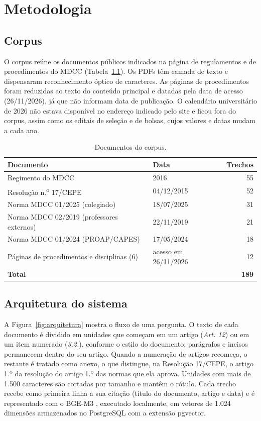 \chapter{Metodologia}
\label{cap:metodologia}

\section{Corpus}
\label{sec:corpus}

O corpus reúne os documentos públicos indicados na página de regulamentos e de
procedimentos do MDCC (Tabela~\ref{tab:corpus}). Os PDFs têm camada de texto e
dispensaram reconhecimento óptico de caracteres. As páginas de procedimentos foram
reduzidas ao texto do conteúdo principal e datadas pela data de acesso
(26/11/2026), já que não informam data de publicação. O calendário universitário de
2026 não estava disponível no endereço indicado pelo site e ficou fora do corpus, assim
como os editais de seleção e de bolsas, cujos valores e datas mudam a cada ano.

\begin{table}[ht]
\centering
\caption{Documentos do corpus.}
\label{tab:corpus}
\footnotesize
\begin{tabular}{llr}
\toprule
\textbf{Documento} & \textbf{Data} & \textbf{Trechos} \\
\midrule
Regimento do MDCC & 2016 & 55 \\
Resolução n.\textsuperscript{o} 17/CEPE & 04/12/2015 & 52 \\
Norma MDCC 01/2025 (colegiado) & 18/07/2025 & 31 \\
Norma MDCC 02/2019 (professores externos) & 22/11/2019 & 21 \\
Norma MDCC 01/2024 (PROAP/CAPES) & 17/05/2024 & 18 \\
Páginas de procedimentos e disciplinas (6) & acesso em 26/11/2026 & 12 \\
\midrule
\textbf{Total} & & \textbf{189} \\
\bottomrule
\end{tabular}

\end{table}

\section{Arquitetura do sistema}
\label{sec:arquitetura}

A Figura~\ref{fig:arquitetura} mostra o fluxo de uma pergunta. O texto de cada
documento é dividido em unidades que começam em um artigo (\textit{Art. 12}) ou em um
item numerado (\textit{3.2.}), conforme o estilo do documento; parágrafos e incisos
permanecem dentro do seu artigo. Quando a numeração de artigos recomeça, o restante é
tratado como anexo, o que distingue, na Resolução 17/CEPE, o artigo 1.º da resolução
do artigo 1.º das normas que ela aprova. Unidades com mais de 1.500 caracteres são
cortadas por tamanho e mantêm o rótulo. Cada trecho recebe como primeira linha a sua
citação (título do documento, artigo e data) e é representado com o BGE-M3
\cite{Chen2024}, executado localmente, em vetores de 1.024 dimensões armazenados no
PostgreSQL com a extensão pgvector.

